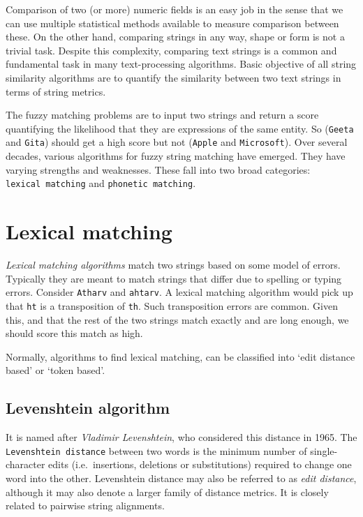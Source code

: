 \documentclass[
]{book}
\begin{document}
Comparison of two (or more) numeric fields is an easy job in the sense that we can use multiple statistical methods available to measure comparison between these. On the other hand, comparing strings in any way, shape or form is not a trivial task. Despite this complexity, comparing text strings is a common and fundamental task in many text-processing algorithms. Basic objective of all string similarity algorithms are to quantify the similarity between two text strings in terms of string metrics.

The fuzzy matching problems are to input two strings and return a score quantifying the likelihood that they are expressions of the same entity. So (\texttt{Geeta} and \texttt{Gita}) should get a high score but not (\texttt{Apple} and \texttt{Microsoft}). Over several decades, various algorithms for fuzzy string matching have emerged. They have varying strengths and weaknesses. These fall into two broad categories: \texttt{lexical\ matching} and \texttt{phonetic\ matching}.

\hypertarget{lexical-matching}{%
\section{Lexical matching}\label{lexical-matching}}

\emph{Lexical matching algorithms} match two strings based on some model of errors. Typically they are meant to match strings that differ due to spelling or typing errors. Consider \texttt{Atharv} and \texttt{ahtarv}. A lexical matching algorithm would pick up that \texttt{ht} is a transposition of \texttt{th}. Such transposition errors are common. Given this, and that the rest of the two strings match exactly and are long enough, we should score this match as high.

Normally, algorithms to find lexical matching, can be classified into `edit distance based' or `token based'.

\hypertarget{levenshtein-algorithm}{%
\subsection{Levenshtein algorithm}\label{levenshtein-algorithm}}

It is named after \emph{Vladimir Levenshtein}, who considered this distance in 1965. The \texttt{Levenshtein\ distance} between two words is the minimum number of single-character edits (i.e.~insertions, deletions or substitutions) required to change one word into the other. Levenshtein distance may also be referred to as \emph{edit distance}, although it may also denote a larger family of distance metrics. It is closely related to pairwise string alignments.
\end{document}
